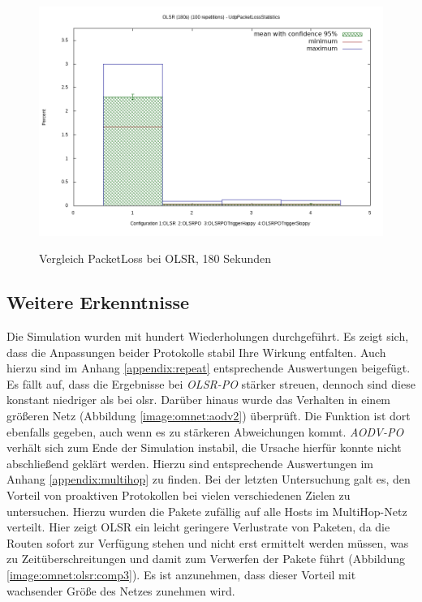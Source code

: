 \begin{figure}
  \centering
  \includegraphics[scale=0.55]{bilder/so3.png} \\
  \caption{Vergleich PacketLoss bei OLSR, 180 Sekunden}
  \label{image:omnet:olsr:so3}
\end{figure}

\subsection{Weitere Erkenntnisse}
\label{chapter:auswertung:erkenntnisse}

Die Simulation wurden mit hundert Wiederholungen durchgeführt. Es zeigt sich, dass die Anpassungen beider Protokolle stabil Ihre Wirkung entfalten. Auch hierzu sind im Anhang \ref{appendix:repeat} entsprechende Auswertungen beigefügt. Es fällt auf, dass die Ergebnisse bei \textit{OLSR-PO} stärker streuen, dennoch sind diese konstant niedriger als bei \gls{olsr}. Darüber hinaus wurde das Verhalten in einem größeren Netz (Abbildung \ref{image:omnet:aodv2}) überprüft. Die Funktion ist dort ebenfalls gegeben, auch wenn es zu stärkeren Abweichungen kommt. \textit{AODV-PO} verhält sich zum Ende der Simulation instabil, die Ursache hierfür konnte nicht abschließend geklärt werden. Hierzu sind entsprechende Auswertungen im Anhang \ref{appendix:multihop} zu finden. Bei der letzten Untersuchung galt es, den Vorteil von proaktiven Protokollen bei vielen verschiedenen Zielen zu untersuchen. Hierzu wurden die Pakete zufällig auf alle Hosts im MultiHop-Netz verteilt. Hier zeigt OLSR ein leicht geringere Verlustrate von Paketen, da die Routen sofort zur Verfügung stehen und nicht erst ermittelt werden müssen, was zu Zeitüberschreitungen und damit zum Verwerfen der Pakete führt (Abbildung \ref{image:omnet:olsr:comp3}). Es ist anzunehmen, dass dieser Vorteil mit wachsender Größe des Netzes zunehmen wird.

